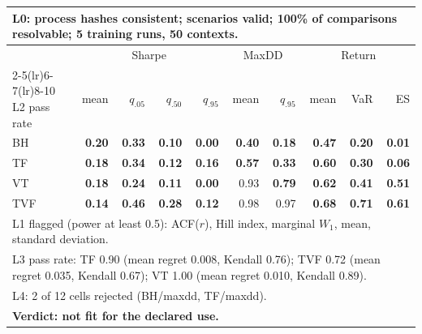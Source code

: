 \begin{tabular}{lrrrrrrrrr}
\toprule
\multicolumn{10}{p{13.5cm}}{L0: process hashes consistent; scenarios valid; 100\% of comparisons resolvable; 5 training runs, 50 contexts.} \\
\midrule
 & \multicolumn{4}{c}{Sharpe} & \multicolumn{2}{c}{MaxDD} & \multicolumn{3}{c}{Return} \\
\cmidrule(lr){2-5}\cmidrule(lr){6-7}\cmidrule(lr){8-10}
L2 pass rate & mean & $q_{.05}$ & $q_{.50}$ & $q_{.95}$ & mean & $q_{.95}$ & mean & VaR & ES \\
\midrule
BH & \textbf{0.20} & \textbf{0.33} & \textbf{0.10} & \textbf{0.00} & \textbf{0.40} & \textbf{0.18} & \textbf{0.47} & \textbf{0.20} & \textbf{0.01} \\
TF & \textbf{0.18} & \textbf{0.34} & \textbf{0.12} & \textbf{0.16} & \textbf{0.57} & \textbf{0.33} & \textbf{0.60} & \textbf{0.30} & \textbf{0.06} \\
VT & \textbf{0.18} & \textbf{0.24} & \textbf{0.11} & \textbf{0.00} & 0.93 & \textbf{0.79} & \textbf{0.62} & \textbf{0.41} & \textbf{0.51} \\
TVF & \textbf{0.14} & \textbf{0.46} & \textbf{0.28} & \textbf{0.12} & 0.98 & 0.97 & \textbf{0.68} & \textbf{0.71} & \textbf{0.61} \\
\midrule
\multicolumn{10}{p{13.5cm}}{L1 flagged (power at least 0.5): ACF($r$), Hill index, marginal $W_1$, mean, standard deviation.} \\
\multicolumn{10}{p{13.5cm}}{L3 pass rate: TF 0.90 (mean regret 0.008, Kendall 0.76); TVF 0.72 (mean regret 0.035, Kendall 0.67); VT 1.00 (mean regret 0.010, Kendall 0.89).} \\
\multicolumn{10}{p{13.5cm}}{L4: 2 of 12 cells rejected (BH/maxdd, TF/maxdd).} \\
\multicolumn{10}{p{13.5cm}}{\textbf{Verdict: not fit for the declared use.}} \\
\bottomrule
\end{tabular}
